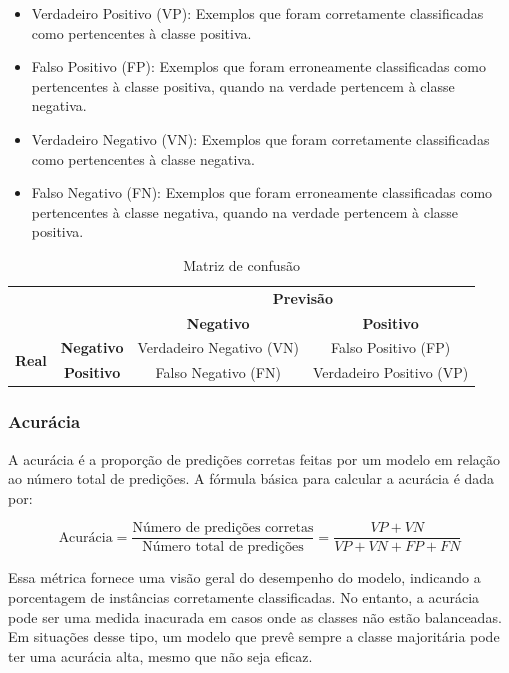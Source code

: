 \begin{itemize}
  \item Verdadeiro Positivo (VP): Exemplos que foram corretamente classificadas como pertencentes à classe positiva.
  \item Falso Positivo (FP): Exemplos que foram erroneamente classificadas como pertencentes à classe positiva, quando na verdade pertencem à classe negativa.
  \item Verdadeiro Negativo (VN): Exemplos que foram corretamente classificadas como pertencentes à classe negativa. 
  \item Falso Negativo (FN): Exemplos que foram erroneamente classificadas como pertencentes à classe negativa, quando na verdade pertencem à classe positiva.
\end{itemize}

\begin{table}[h]
  \centering
  \begin{tabular}{cc|cc|}
    \cline{3-4}
  & & \multicolumn{2}{c|}{\textbf{Previsão}} \\ \cline{3-4}
  & & \textbf{Negativo} & \textbf{Positivo} \\ \hline
  \multicolumn{1}{|c|}{\multirow{2}{*}{\textbf{Real}}} & \textbf{Negativo} & Verdadeiro Negativo (VN) & Falso Positivo (FP) \\  
  \multicolumn{1}{|c|}{} & \textbf{Positivo} & Falso Negativo (FN) & Verdadeiro Positivo (VP) \\ \hline
  \end{tabular}
  \caption{Matriz de confusão}
  \label{table:confusion_matrix}
\end{table}

\subsubsection{Acurácia}
A acurácia é a proporção de predições corretas feitas por um modelo em relação ao número total de predições. 
A fórmula básica para calcular a acurácia é dada por:

\begin{equation}
  \text{Acurácia} = \frac{\text{Número de predições corretas}}{\text{Número total de predições}} = \frac{VP+VN}{VP+VN+FP+FN}
\end{equation}

Essa métrica fornece uma visão geral do desempenho do modelo, indicando a porcentagem de instâncias corretamente classificadas.
No entanto, a acurácia pode ser uma medida inacurada em casos onde as classes não estão balanceadas. 
Em situações desse tipo, um modelo que prevê sempre a classe majoritária pode ter uma acurácia alta, mesmo que não seja eficaz.

